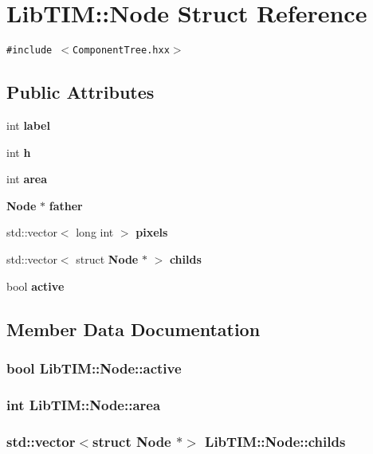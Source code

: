 \section{Lib\-TIM::Node Struct Reference}
\label{structLibTIM_1_1Node}
{\tt \#include $<$Component\-Tree.hxx$>$}

\subsection*{Public Attributes}
\begin{CompactItemize}
\item 
int {\bf label}
\item 
int {\bf h}
\item 
int {\bf area}
\item 
{\bf Node} $\ast$ {\bf father}
\item 
std::vector$<$ long int $>$ {\bf pixels}
\item 
std::vector$<$ struct {\bf Node} $\ast$ $>$ {\bf childs}
\item 
bool {\bf active}
\end{CompactItemize}


\subsection{Member Data Documentation}
\subsubsection{\setlength{\rightskip}{0pt plus 5cm}bool {\bf Lib\-TIM::Node::active}}\label{structLibTIM_1_1Node_o6}


\subsubsection{\setlength{\rightskip}{0pt plus 5cm}int {\bf Lib\-TIM::Node::area}}\label{structLibTIM_1_1Node_o2}


\subsubsection{\setlength{\rightskip}{0pt plus 5cm}std::vector$<$struct {\bf Node} $\ast$$>$ {\bf Lib\-TIM::Node::childs}}\label{structLibTIM_1_1Node_o5}



